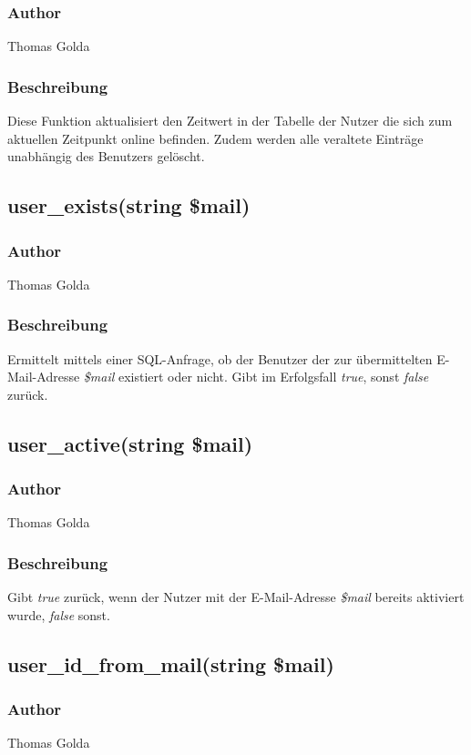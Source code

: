 \documentclass[fontsize = 12pt, paper = a4]{scrreprt}
\begin{document}
\subsubsection*{Author}
Thomas Golda
\subsubsection*{Beschreibung}
Diese Funktion aktualisiert den Zeitwert in der Tabelle der Nutzer die sich zum aktuellen Zeitpunkt online befinden. Zudem werden alle veraltete Einträge unabhängig des Benutzers gelöscht.


\subsection*{user\_exists(string \$mail)}
\subsubsection*{Author}
Thomas Golda
\subsubsection*{Beschreibung}
Ermittelt mittels einer SQL-Anfrage, ob der Benutzer der zur übermittelten E-Mail-Adresse \textit{\$mail} existiert oder nicht. Gibt im Erfolgsfall \textit{true}, sonst \textit{false} zurück.


\subsection*{user\_active(string \$mail)}
\subsubsection*{Author}
Thomas Golda
\subsubsection*{Beschreibung}
Gibt \textit{true} zurück, wenn der Nutzer mit der E-Mail-Adresse \textit{\$mail} bereits aktiviert wurde, \textit{false} sonst.


\subsection*{user\_id\_from\_mail(string \$mail)}
\subsubsection*{Author}
Thomas Golda
\end{document}
